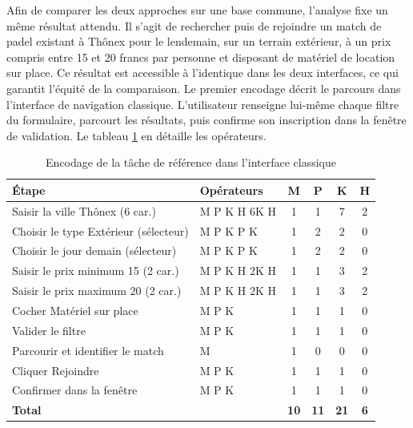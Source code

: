 \documentclass[12pt]{article}
\begin{document}
\vspace{0.3cm}
Afin de comparer les deux approches sur une base commune, l'analyse fixe un même résultat attendu. Il s'agit de rechercher puis de rejoindre un match de padel existant à Thônex pour le lendemain, sur un terrain extérieur, à un prix compris entre 15 et 20 francs par personne et disposant de matériel de location sur place. Ce résultat est accessible à l'identique dans les deux interfaces, ce qui garantit l'équité de la comparaison.
\newline\newline
Le premier encodage décrit le parcours dans l'interface de navigation classique. L'utilisateur renseigne lui-même chaque filtre du formulaire, parcourt les résultats, puis confirme son inscription dans la fenêtre de validation. Le tableau \ref{tab:klm_classique} en détaille les opérateurs.
\vspace{0.5cm}
\begin{table}[H]
    \centering
    \begin{tabularx}{\textwidth}{|X|l|c|c|c|c|}
    \hline
    \rowcolor[gray]{0.9}
    \textbf{Étape} & \textbf{Opérateurs} & \textbf{M} & \textbf{P} & \textbf{K} & \textbf{H} \\ \hline
    Saisir la ville Thônex (6 car.) & M P K H 6K H & 1 & 1 & 7 & 2 \\ \hline
    Choisir le type Extérieur (sélecteur) & M P K P K & 1 & 2 & 2 & 0 \\ \hline
    Choisir le jour demain (sélecteur) & M P K P K & 1 & 2 & 2 & 0 \\ \hline
    Saisir le prix minimum 15 (2 car.) & M P K H 2K H & 1 & 1 & 3 & 2 \\ \hline
    Saisir le prix maximum 20 (2 car.) & M P K H 2K H & 1 & 1 & 3 & 2 \\ \hline
    Cocher Matériel sur place & M P K & 1 & 1 & 1 & 0 \\ \hline
    Valider le filtre & M P K & 1 & 1 & 1 & 0 \\ \hline
    Parcourir et identifier le match & M & 1 & 0 & 0 & 0 \\ \hline
    Cliquer Rejoindre & M P K & 1 & 1 & 1 & 0 \\ \hline
    Confirmer dans la fenêtre & M P K & 1 & 1 & 1 & 0 \\ \hline
    \rowcolor[gray]{0.95}
    \textbf{Total} & & \textbf{10} & \textbf{11} & \textbf{21} & \textbf{6} \\ \hline
    \end{tabularx}
    \caption{Encodage de la tâche de référence dans l'interface classique}
    \label{tab:klm_classique}
\end{table}
\end{document}

